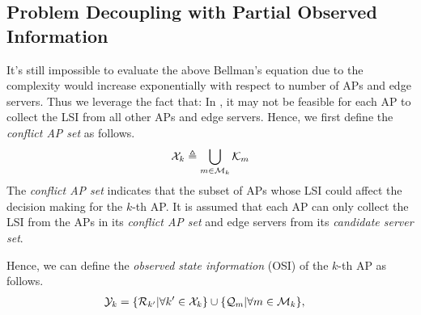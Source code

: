 \subsection{Problem Decoupling with Partial Observed Information}
It's still impossible to evaluate the above Bellman's equation due to the complexity would increase exponentially with respect to number of APs and edge servers.
Thus we leverage the fact that:
In , it may not be feasible for each AP to collect the LSI from all other APs and edge servers.
Hence, we first define the \emph{conflict AP set} as follows.
\begin{align}
    \mathcal{X}_{k} \triangleq \bigcup_{m\in\mathcal{M}_{k}} \mathcal{K}_{m}
\end{align}
The \emph{conflict AP set} indicates that the subset of APs whose LSI could affect the decision making for the $k$-th AP.
It is assumed that each AP can only collect the LSI from the APs in its \emph{conflict AP set} and edge servers from its \emph{candidate server set}.
\begin{definition}
    Hence, we can define the \emph{observed state information} (OSI) of the $k$-th AP as follows.
    \begin{align}
        \mathcal{Y}_{k} &= \{\mathcal{R}_{k'} | \forall k'\in\mathcal{X}_{k}\}
                        \cup \{\mathcal{Q}_{m} | \forall m\in\mathcal{M}_{k}\},
    \end{align}
\end{definition}


